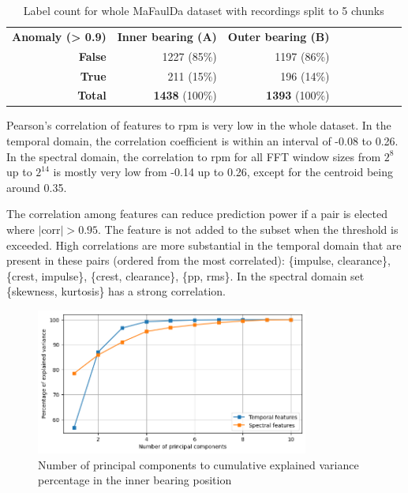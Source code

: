 \begin{table}[ht]
\begin{tabular}{rrrrrllll}
\multicolumn{1}{|l|}{\textbf{Anomaly (> 0.9)}}                                                                                          & \multicolumn{1}{l|}{\textbf{Inner bearing (A)}} & \multicolumn{1}{l|}{\textbf{Outer bearing (B)}} \\ \cline{1-3}
\multicolumn{1}{|r|}{\textbf{False}}                                                                            & \multicolumn{1}{r|}{1227 (85\%)}                 & \multicolumn{1}{r|}{1197 (86\%)}         \\ \cline{1-3}
\multicolumn{1}{|r|}{\textbf{True}}                                                                             & \multicolumn{1}{r|}{211 (15\%)}                 & \multicolumn{1}{r|}{196 (14\%)}         \\ \cline{1-3}
\multicolumn{1}{|r|}{\textbf{Total}}                                                                            & \multicolumn{1}{r|}{\textbf{1438} (100\%)}                       & \multicolumn{1}{r|}{\textbf{1393} (100\%)}               \\ \cline{1-3}
\end{tabular}
\caption{Label count for whole MaFaulDa dataset with recordings split to 5 chunks}
\label{tab:observation-counts}
\end{table}

Pearson's correlation of features to rpm is very low in the whole dataset. In the temporal domain, the correlation coefficient is within an interval of -0.08 to 0.26. In the spectral domain, the correlation to rpm for all FFT window sizes from $2^8$ up to $2^{14}$ is mostly very low from -0.14 up to 0.26, except for the centroid being around 0.35.

The correlation among features can reduce prediction power if a pair is elected where $|\mathrm{corr}| > 0.95$. The feature is not added to the subset when the threshold is exceeded. High correlations are more substantial in the temporal domain that are present in these pairs (ordered from the most correlated): \{impulse, clearance\}, \{crest, impulse\}, \{crest, clearance\}, \{pp, rms\}. In the spectral domain set \{skewness, kurtosis\} has a strong correlation.

\begin{figure}[h!]
    \centering
    \includegraphics[width=0.8\textwidth]{assets/design/pca-explained-variance.png}
    \caption{Number of principal components to cumulative explained variance percentage in the inner bearing position}
    \label{fig:design:pca-explained-variance} 
\end{figure}

